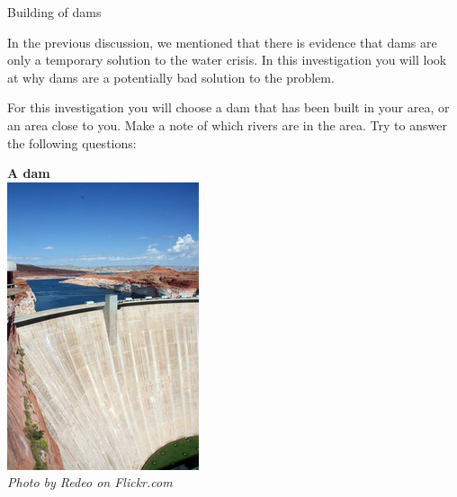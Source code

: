\label{m38138*id0123}
            \begin{Investigation}{Building of dams}
            \nopagebreak
\begin{minipage}{.6\textwidth}
\label{m38138*id0128031}In the previous discussion, we mentioned that there is evidence that dams are only a temporary solution to the water crisis. In this investigation you will look at why dams are a potentially bad solution to the problem. 
\par 
\label{m38138*id473692}For this investigation you will choose a dam that has been built in your area, or an area close to you. Make a note of which rivers are in the area. Try to answer the following questions: 
\end{minipage}
\begin{minipage}{.3\textwidth}
 \begin{center}
\textbf{A dam}\\
  \includegraphics[height=.8\textwidth]{photos/Redeo.jpg} \\
\textsl{Photo by Redeo on Flickr.com}
 \end{center}

\end{minipage}\\


\end{Investigation}

